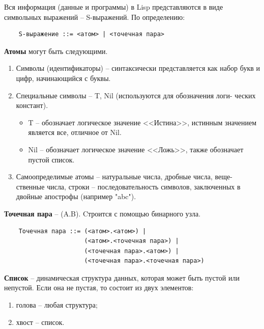 \documentclass[a4paper,14pt, unknownkeysallowed]{extreport}
\begin{document}
Вся информация (данные и программы) в Lisp представляются в виде символьных выражений -- S-выражений. По определению:

\begin{center}
\captionsetup{justification=raggedright,singlelinecheck=off}
\begin{lstlisting}
	S-выражение ::= <атом> | <точечная пара>
\end{lstlisting}
\end{center}	

\textbf{Атомы} могут быть следующими.

\begin{enumerate}
	\item Символы (идентификаторы) -- синтаксически представляется как набор букв и цифр, начинающийся с буквы.
	\item Специальные символы -- T, Nil (используются для обозначения логи- ческих констант).
	\begin{itemize}
		\item T -- обозначает логическое значение <<Истина>>, истинным значением является все, отличное от Nil.
		\item Nil -- обозначает логическое значение <<Ложь>>, также обозначает пустой список.
	\end{itemize}
	\item Самоопределимые атомы -- натуральные числа, дробные числа, веще- ственные числа, строки -- последовательность символов, заключенных в двойные апострофы (например "abc").
\end{enumerate}

\textbf{Точечная пара} -- (A.B). Cтроится с помощью бинарного узла.

\begin{center}
\captionsetup{justification=raggedright,singlelinecheck=off}
\begin{lstlisting}
	Точечная пара ::= (<атом>.<атом>) | 
					  (<атом>.<точечная пара>) |
					  (<точечная пара>.<атом>) | 
					  (<точечная пара>.<точечная пара>)
\end{lstlisting}
\end{center}	

\textbf{Список} -- динамическая структура данных, которая может быть пустой или непустой. Если она не пустая, то состоит из двух элементов:

\begin{enumerate}
	\item голова -- любая структура;
	\item хвост -- список.
\end{enumerate}
\end{document}
